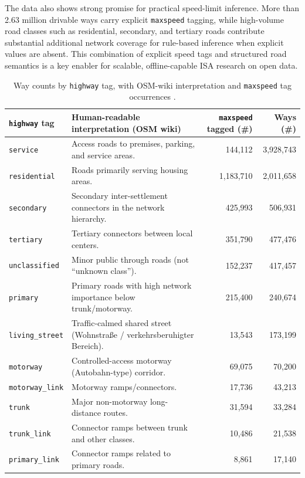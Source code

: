 \documentclass{article}
\begin{document}
The data also shows strong promise for practical speed-limit inference. More than 2.63 million drivable ways carry explicit \texttt{maxspeed} tagging, while high-volume road classes such as residential, secondary, and tertiary roads contribute substantial additional network coverage for rule-based inference when explicit values are absent. This combination of explicit speed tags and structured road semantics is a key enabler for scalable, offline-capable ISA research on open data.

\begin{table}[!htbp]
\centering
\caption{Way counts by \texttt{highway} tag, with OSM-wiki interpretation and \texttt{maxspeed} tag occurrences \cite{osmwiki_highways,osmwiki_maxspeed}.}
\label{tab:highway_distribution}
\scriptsize
\begin{tabular}{p{1.8cm}p{5.2cm}rr}
\toprule
\texttt{highway} tag & Human-readable interpretation (OSM wiki) & \texttt{maxspeed} tagged (\#) & Ways (\#) \\
\midrule
\texttt{service} & Access roads to premises, parking, and service areas. & 144{,}112 & 3{,}928{,}743 \\
\texttt{residential} & Roads primarily serving housing areas. & 1{,}183{,}710 & 2{,}011{,}658 \\
\texttt{secondary} & Secondary inter-settlement connectors in the network hierarchy. & 425{,}993 & 506{,}931 \\
\texttt{tertiary} & Tertiary connectors between local centers. & 351{,}790 & 477{,}476 \\
\texttt{unclassified} & Minor public through roads (not ``unknown class''). & 152{,}237 & 417{,}457 \\
\texttt{primary} & Primary roads with high network importance below trunk/motorway. & 215{,}400 & 240{,}674 \\
\texttt{living\_street} & Traffic-calmed shared street (Wohnstra{\ss}e / verkehrsberuhigter Bereich). & 13{,}543 & 173{,}199 \\
\texttt{motorway} & Controlled-access motorway (Autobahn-type) corridor. & 69{,}075 & 70{,}200 \\
\texttt{motorway\_link} & Motorway ramps/connectors. & 17{,}736 & 43{,}213 \\
\texttt{trunk} & Major non-motorway long-distance routes. & 31{,}594 & 33{,}284 \\
\texttt{trunk\_link} & Connector ramps between trunk and other classes. & 10{,}486 & 21{,}538 \\
\texttt{primary\_link} & Connector ramps related to primary roads. & 8{,}861 & 17{,}140 \\

\end{tabular}
\end{table}
\end{document}
